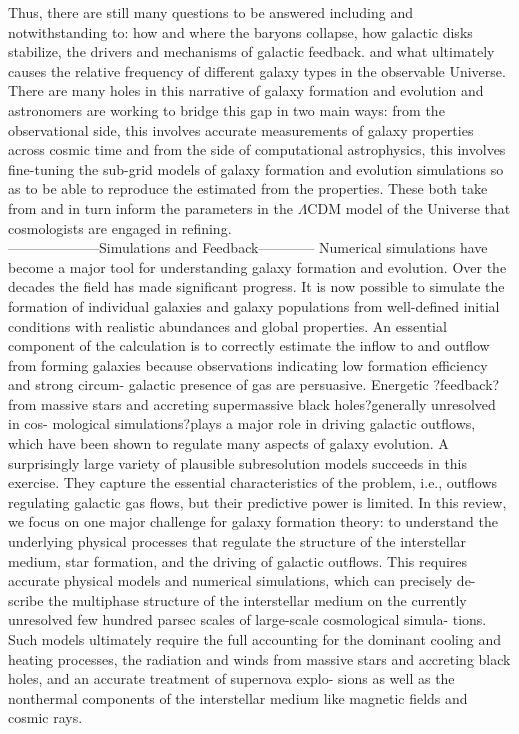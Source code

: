Thus, there are still many questions to be answered including and notwithstanding to: how and where the baryons collapse, how galactic disks stabilize, the drivers and mechanisms of galactic feedback. and what ultimately causes the relative frequency of different galaxy types in the observable Universe. There are many holes in this narrative of galaxy formation and evolution and astronomers are working to bridge this gap in two main ways: from the observational side, this involves accurate measurements of galaxy properties across cosmic time and from the side of computational astrophysics, this involves fine-tuning the sub-grid models of galaxy formation and evolution simulations so as to be able to reproduce the estimated from the properties. These both take from and in turn inform the parameters in the $\Lambda$CDM model of the Universe that cosmologists are engaged in refining.\\


--------------------Simulations and Feedback------------
Numerical simulations have become a major tool for understanding galaxy formation and evolution. Over the decades the field has made significant progress. It is now possible to simulate the formation of individual galaxies and galaxy populations from well-defined initial conditions with realistic abundances and global properties. An essential component of the calculation is to correctly estimate the inflow to and outflow from forming galaxies because observations indicating low formation efficiency and strong circum- galactic presence of gas are persuasive. Energetic ?feedback? from massive stars and accreting supermassive black holes?generally unresolved in cos- mological simulations?plays a major role in driving galactic outflows, which have been shown to regulate many aspects of galaxy evolution. A surprisingly large variety of plausible subresolution models succeeds in this exercise. They capture the essential characteristics of the problem, i.e., outflows regulating galactic gas flows, but their predictive power is limited. In this review, we focus on one major challenge for galaxy formation theory: to understand the underlying physical processes that regulate the structure of the interstellar medium, star formation, and the driving of galactic outflows. This requires accurate physical models and numerical simulations, which can precisely de- scribe the multiphase structure of the interstellar medium on the currently unresolved few hundred parsec scales of large-scale cosmological simula- tions. Such models ultimately require the full accounting for the dominant cooling and heating processes, the radiation and winds from massive stars and accreting black holes, and an accurate treatment of supernova explo- sions as well as the nonthermal components of the interstellar medium like magnetic fields and cosmic rays.


